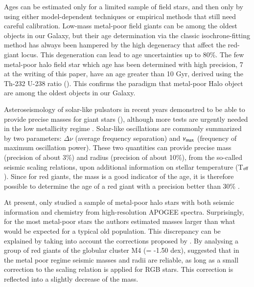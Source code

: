 \documentclass{aa}
\begin{document}
Ages can be estimated only for a limited sample of field stars, and then only by using either model-dependent techniques or empirical methods that still need careful calibration. Low-mass metal-poor field giants can be among the oldest objects in our Galaxy, but their age determination via the classic isochrone-fitting method has always been hampered by the high degeneracy that affect the red-giant locus. This degeneration can lead to age uncertainties up to 80\%. The few metal-poor halo field star which age has been determined with high precision, 7 at the writing of this paper, have an age greater than 10 Gyr, derived using the Th-232 U-238 ratio (). This confirms the paradigm that metal-poor Halo object are among the oldest objects in our Galaxy.  

Asteroseismology of solar-like pulsators in recent years demonstred to be able to provide precise masses for giant stars (\citealp{Davies2015, Lebreton2014, Miglio2013, SilvaAguirre2015, Anders2016}), although more tests are urgently needed in the low metallicity regime \citep{Epstein2014}. Solar-like oscillations are commonly summarized by two parameters: $\Delta\nu$ (average frequency separation) and $\nu_{\rm max}$ (frequency of maximum oscillation power). These two quantities can provide precise mass (precision of about 3\%) and radius (precision of about 10\%), from the so-called seismic scaling relations, upon additional information on stellar temperature (T$_{\rm eff}$).  Since for red giants, the mass is a good indicator of the age, it is therefore possible to determine the age of a red giant with a precision better than 30\% \citep{Davies2016}. 

At present, only \citet{Epstein2014} studied a sample of metal-poor halo stars with both seismic information and chemistry from high-resolution APOGEE spectra. Surprisingly, for the most metal-poor stars the authors estimated masses larger than what would be expected for a typical old population. This discrepancy can be explained by taking into account the corrections proposed by \citet{Miglio2016}. By analysing a group of red giants of the globular cluster M4 (\FeH = -1.50 dex), \citet{Miglio2016} suggested that in the metal poor regime seismic masses and radii are reliable, as long as a small correction to the \deltanu scaling relation is applied for RGB stars. This correction is reflected into a slightly decrease of the mass. 
\end{document}
